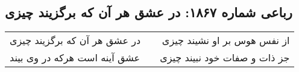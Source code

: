 \begin{center}
\section*{رباعی شماره ۱۸۶۷: در عشق هر آن که برگزیند چیزی}
\label{sec:1867}
\begin{longtable}{l p{0.5cm} r}
در عشق هر آن که برگزیند چیزی
&&
از نفس هوس بر او نشیند چیزی
\\
عشق آینه است هرکه در وی بیند
&&
جز ذات و صفات خود نبیند چیزی
\\
\end{longtable}
\end{center}
